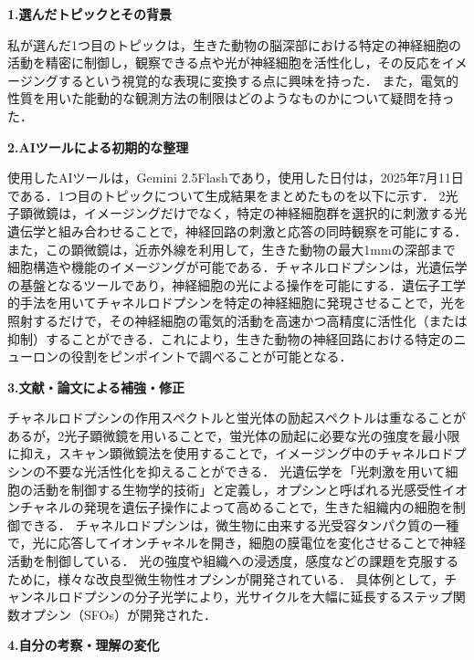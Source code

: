 \documentclass{classes/report}
\begin{document}

\newpage

\clearpage
\textbf{\large 1.選んだトピックとその背景}

私が選んだ1つ目のトピックは，生きた動物の脳深部における特定の神経細胞の活動を精密に制御し，観察できる点や光が神経細胞を活性化し，その反応をイメージングするという視覚的な表現に変換する点に興味を持った．
また，電気的性質を用いた能動的な観測方法の制限はどのようなものかについて疑問を持った．


\textbf{\large 2.AIツールによる初期的な整理}

使用したAIツールは，Gemini 2.5Flashであり，使用した日付は，2025年7月11日である．1つ目のトピックについて生成結果をまとめたものを以下に示す．
2光子顕微鏡は，イメージングだけでなく，特定の神経細胞群を選択的に刺激する光遺伝学と組み合わせることで，神経回路の刺激と応答の同時観察を可能にする．
また，この顕微鏡は，近赤外線を利用して，生きた動物の最大1mmの深部まで細胞構造や機能のイメージングが可能である．チャネルロドプシンは，光遺伝学の基盤となるツールであり，神経細胞の光による操作を可能にする．遺伝子工学的手法を用いてチャネルロドプシンを特定の神経細胞に発現させることで，光を照射するだけで，その神経細胞の電気的活動を高速かつ高精度に活性化（または抑制）することができる．これにより，生きた動物の神経回路における特定のニューロンの役割をピンポイントで調べることが可能となる．

\textbf{\large 3.文献・論文による補強・修正}

チャネルロドプシンの作用スペクトルと蛍光体の励起スペクトルは重なることがあるが，2光子顕微鏡を用いることで，蛍光体の励起に必要な光の強度を最小限に抑え，スキャン顕微鏡法を使用することで，イメージング中のチャネルロドプシンの不要な光活性化を抑えることができる\cite{YIZHAR20119}．
光遺伝学を「光刺激を用いて細胞の活動を制御する生物学的技術」と定義し，オプシンと呼ばれる光感受性イオンチャネルの発現を遺伝子操作によって高めることで，生きた組織内の細胞を制御できる．
チャネルロドプシンは，微生物に由来する光受容タンパク質の一種で，光に応答してイオンチャネルを開き，細胞の膜電位を変化させることで神経活動を制御している\cite{Xu02012020}．
光の強度や組織への浸透度，感度などの課題を克服するために，様々な改良型微生物性オプシンが開発されている．
具体例として，チャンネルロドプシンの分子光学により，光サイクルを大幅に延長するステップ関数オプシン（SFOs）が開発された．


\textbf{\large 4.自分の考察・理解の変化}
\end{document}
